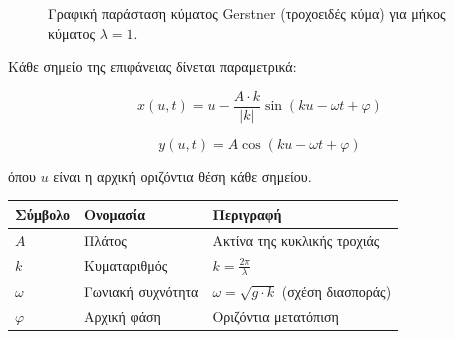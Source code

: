 \documentclass[
  a4paper,
  11pt,
]{article}
\begin{document}
\begin{figure}[htbp]
\centering
{}
\caption{Γραφική παράσταση κύματος Gerstner (τροχοειδές κύμα) για μήκος κύματος $\lambda = 1$.}
\label{fig:gerstner}
\end{figure}

Κάθε σημείο της επιφάνειας δίνεται παραμετρικά:

\[x(u, t) = u - \frac{A \cdot k}{|k|} \sin(k u - \omega t + \varphi)\]

\[y(u, t) = A \cos(k u - \omega t + \varphi)\]

όπου \(u\) είναι η αρχική οριζόντια θέση κάθε σημείου.

\begin{longtable}[]{@{}
  >{\raggedright\arraybackslash}p{}
  >{\raggedright\arraybackslash}p{}
  >{\raggedright\arraybackslash}p{}@{}}
\toprule\noalign{}
\begin{minipage}[b]{\linewidth}\raggedright
Σύμβολο
\end{minipage} & \begin{minipage}[b]{\linewidth}\raggedright
Ονομασία
\end{minipage} & \begin{minipage}[b]{\linewidth}\raggedright
Περιγραφή
\end{minipage} \\
\midrule\noalign{}
\endhead
\bottomrule\noalign{}
\endlastfoot
\(A\) & Πλάτος & Ακτίνα της κυκλικής τροχιάς \\
\(k\) & Κυματαριθμός & \(k = \frac{2\pi}{\lambda}\) \\
\(\omega\) & Γωνιακή συχνότητα & \(\omega = \sqrt{g \cdot k}\) (σχέση
διασποράς) \\
\(\varphi\) & Αρχική φάση & Οριζόντια μετατόπιση \\
\end{longtable}
\end{document}
